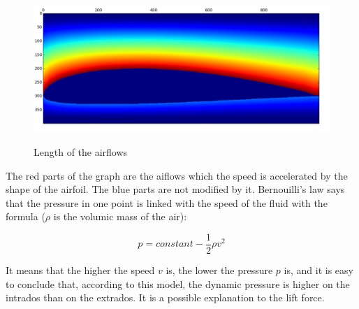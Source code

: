\documentclass{article}
\begin{document}
\begin{figure}[h]
  \centering
  \caption{Length of the airflows}
  \includegraphics[width=13cm]{boeing_length}
  \label{boeing_length}
\end{figure}

The red parts of the graph are the aiflows which the speed is accelerated by the shape of the airfoil. The blue parts are not modified by it. Bernouilli's law says that the pressure in one point is linked with the speed of the fluid with the formula ($\rho$ is the volumic mass of the air):

\begin{equation}
  p = constant - \frac{1}{2} \rho v^2
\end{equation}

It means that the higher the speed $v$ is, the lower the pressure $p$ is, and it is easy to conclude that, according to this model, the dynamic pressure is higher on the intrados than on the extrados. It is a possible explanation to the lift force.
\end{document}
